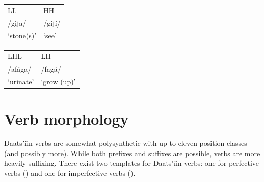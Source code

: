 \documentclass[output=paper]{langsci/langscibook}
\begin{document}
\ea\label{ex:ahlandc:4}

\begin{tabular}{ll}
LL &   HH  \\
/giʃa/  &    /gíʃí/ \\
‘stone(s)’    &  ‘see’ \\
 \end{tabular}
\z

\ea\label{ex:ahlandc:5}

\begin{tabular}{ll}
LHL   &     LH \\
  /afága/   &  /fagá/ \\
  ‘urinate’  &  ‘grow (up)’ \\
\end{tabular}
\z 

\section{Verb morphology}\label{sec:ahlandc:4}

Daatsʼíin verbs are somewhat polysynthetic with up to eleven position classes (and possibly more). While both prefixes and suffixes are possible, verbs are more heavily suffixing. There exist two templates for Daatsʼíin verbs: one for perfective verbs () and one for imperfective verbs ().
\end{document}
